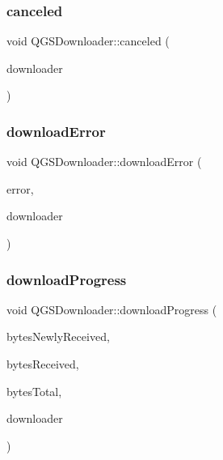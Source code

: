 \mbox{\label{class_q_g_s_downloader_ae45b33f63a72ad89fd8fd026c38750f6}} 
\subsubsection{\texorpdfstring{canceled}{canceled}}
{\footnotesize\ttfamily void Q\+G\+S\+Downloader\+::canceled (\begin{DoxyParamCaption}\item[{\mbox{\hyperlink{class_q_g_s_downloader}{Q\+G\+S\+Downloader}} $\ast$}]{downloader }\end{DoxyParamCaption})\hspace{0.3cm}{\ttfamily [signal]}}

\mbox{\label{class_q_g_s_downloader_a10e903efc5fc57e577351cc3181663f0}} 
\subsubsection{\texorpdfstring{download\+Error}{downloadError}}
{\footnotesize\ttfamily void Q\+G\+S\+Downloader\+::download\+Error (\begin{DoxyParamCaption}\item[{\mbox{\hyperlink{class_q_g_s_network_error}{Q\+G\+S\+Network\+Error}}}]{error,  }\item[{\mbox{\hyperlink{class_q_g_s_downloader}{Q\+G\+S\+Downloader}} $\ast$}]{downloader }\end{DoxyParamCaption})\hspace{0.3cm}{\ttfamily [signal]}}

\mbox{\label{class_q_g_s_downloader_a4ffa6614b2b7d2d0edfcfdc6e68d058a}} 
\subsubsection{\texorpdfstring{download\+Progress}{downloadProgress}}
{\footnotesize\ttfamily void Q\+G\+S\+Downloader\+::download\+Progress (\begin{DoxyParamCaption}\item[{qint64}]{bytes\+Newly\+Received,  }\item[{qint64}]{bytes\+Received,  }\item[{qint64}]{bytes\+Total,  }\item[{\mbox{\hyperlink{class_q_g_s_downloader}{Q\+G\+S\+Downloader}} $\ast$}]{downloader }\end{DoxyParamCaption})\hspace{0.3cm}{\ttfamily [signal]}}

